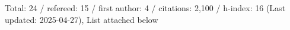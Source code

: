 Total: 24 / refereed: 15 / first author: 4 / citations: 2,100 / h-index: 16 (Last updated: 2025-04-27), List attached below